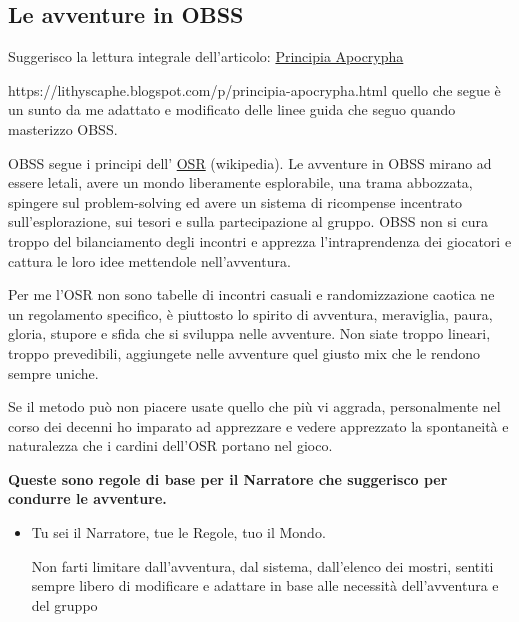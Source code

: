 \begin{multicols}{2}
\subsection{Le avventure in OBSS} \hypertarget{OSR}{} \label{avventureinobss}

Suggerisco la lettura integrale dell'articolo: \href{https://lithyscaphe.blogspot.com/p/principia-apocrypha.html} {Principia Apocrypha}

https://lithyscaphe.blogspot.com/p/principia-apocrypha.html quello che segue è un sunto da me adattato e modificato delle linee guida che seguo quando masterizzo OBSS.

OBSS segue i principi dell' \href{https://it.wikipedia.org/wiki/Old_School_Renaissance}{OSR} (wikipedia). Le avventure in OBSS mirano ad essere letali, avere un mondo liberamente esplorabile, una trama abbozzata, spingere sul problem-solving ed avere un sistema di ricompense incentrato sull'esplorazione, sui tesori e sulla partecipazione al gruppo. OBSS non si cura troppo del bilanciamento degli incontri e apprezza l'intraprendenza dei giocatori e cattura le loro idee mettendole nell'avventura.

Per me l'OSR non sono tabelle di incontri casuali e randomizzazione caotica ne un regolamento specifico, è piuttosto lo spirito di avventura, meraviglia, paura, gloria, stupore e sfida che si sviluppa nelle avventure. Non siate troppo lineari, troppo prevedibili, aggiungete nelle avventure quel giusto mix che le rendono sempre uniche.

Se il metodo può non piacere usate quello che più vi aggrada, personalmente nel corso dei decenni ho imparato ad apprezzare e vedere apprezzato la spontaneità e naturalezza che i cardini dell'OSR portano nel gioco.

\bigskip

\textbf{Queste sono regole di base per il Narratore che suggerisco per condurre le avventure.}

\medskip

\begin{itemize}[leftmargin=*] \setlength{\itemsep}{0pt}

\item
Tu sei il Narratore, tue le Regole, tuo il Mondo.

Non farti limitare dall'avventura, dal sistema, dall'elenco dei mostri, sentiti sempre libero di modificare e adattare in base alle necessità dell'avventura e del gruppo


\end{itemize}
\end{multicols}

